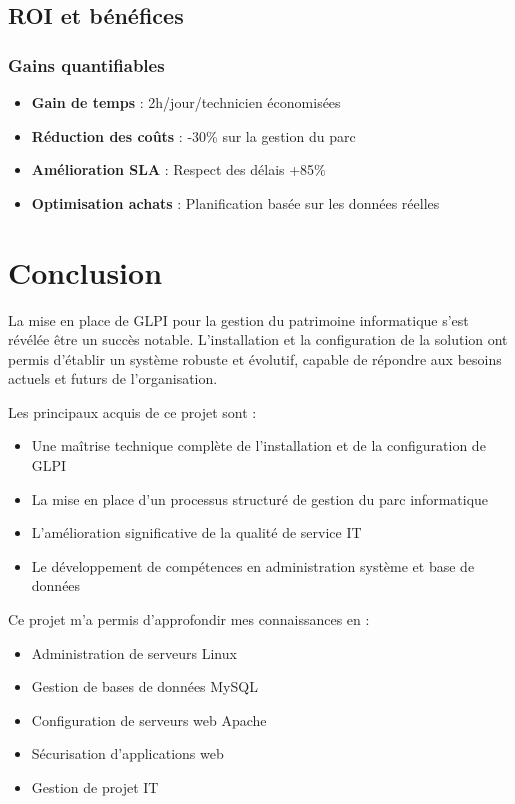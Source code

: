 \documentclass[12pt,a4paper]{article}
\begin{document}
\subsection{ROI et bénéfices}

\subsubsection{Gains quantifiables}
\begin{itemize}
    \item \textbf{Gain de temps} : 2h/jour/technicien économisées
    \item \textbf{Réduction des coûts} : -30\% sur la gestion du parc
    \item \textbf{Amélioration SLA} : Respect des délais +85\%
    \item \textbf{Optimisation achats} : Planification basée sur les données réelles
\end{itemize}

\section{Conclusion}

La mise en place de GLPI pour la gestion du patrimoine informatique s'est révélée être un succès notable. L'installation et la configuration de la solution ont permis d'établir un système robuste et évolutif, capable de répondre aux besoins actuels et futurs de l'organisation.

Les principaux acquis de ce projet sont :
\begin{itemize}
    \item Une maîtrise technique complète de l'installation et de la configuration de GLPI
    \item La mise en place d'un processus structuré de gestion du parc informatique
    \item L'amélioration significative de la qualité de service IT
    \item Le développement de compétences en administration système et base de données
\end{itemize}

Ce projet m'a permis d'approfondir mes connaissances en :
\begin{itemize}
    \item Administration de serveurs Linux
    \item Gestion de bases de données MySQL
    \item Configuration de serveurs web Apache
    \item Sécurisation d'applications web
    \item Gestion de projet IT
\end{itemize}
\end{document}
